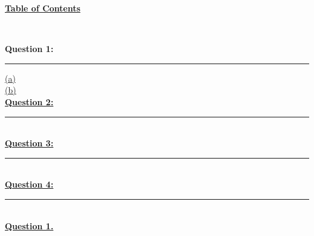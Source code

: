 \documentclass[12pt]{article}
\begin{document}
\begin{center}
	\hypertarget{toc}{\LARGE \noindent \underline{\textbf{Table of Contents}}}\\
\end{center}
\noindent \textbf{Question 1:}
\vspace{1mm}
\hrule
\vspace{1mm}
\noindent\hyperlink{1.1}{(a)}\\
\hyperlink         {1.2}{(b)}\\

\noindent \hyperlink{2}{\textbf{Question 2:}}
\vspace{1mm}
\hrule
\vspace{1mm} \leavevmode \\

\noindent \hyperlink{3}{\textbf{Question 3:}}
\vspace{1mm}
\hrule
\vspace{1mm} \leavevmode \\

\noindent \hyperlink{4}{\textbf{Question 4:}}
\vspace{1mm}
\hrule
\vspace{1mm} \leavevmode \\

\newpage
{\LARGE \noindent \underline{\textbf{Question 1.}}}\\
\end{document}
